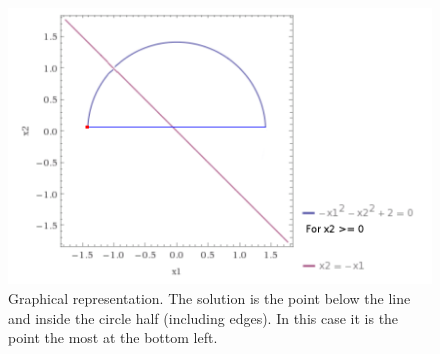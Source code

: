 \documentclass[eng,openany]{mgr}
\begin{document}
\begin{figure}[h]
\centering
\includegraphics[width=0.9\linewidth]{screenshot004}
\caption{Graphical representation. The solution is the point below the line and inside the circle half (including edges).
In this case it is the point the most at the bottom left.}
\label{fig:screenshot004}
\end{figure}

\clearpage 
\end{document}
